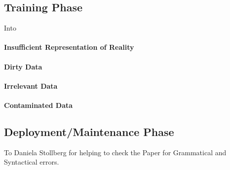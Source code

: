\documentclass[sigconf,nonacm,natbib=false]{acmart}
\begin{document}
\subsection{Training Phase}
Into
\paragraph{Insufficient Representation of Reality}
\paragraph{Dirty Data}
\paragraph{Irrelevant Data}
\paragraph{Contaminated Data}

\subsection{Deployment/Maintenance Phase}


%
\begin{acks}
To Daniela Stollberg for helping to check the Paper for Grammatical and Syntactical errors.
\end{acks}

%

\nocite{*}

\printbibliography

% 
\appendix
\end{document}
